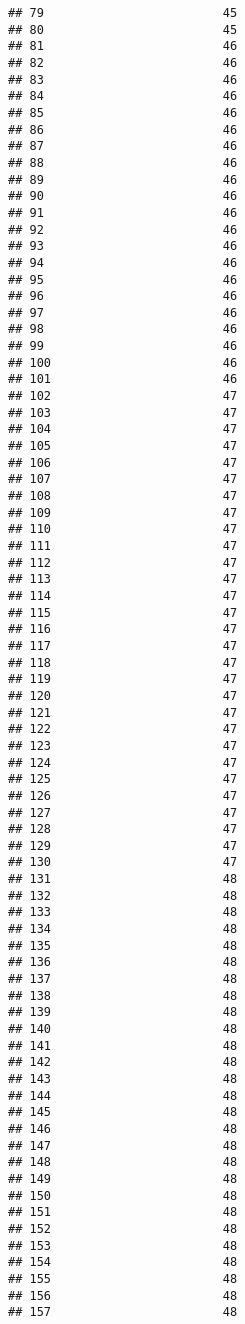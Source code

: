 \documentclass[
]{article}
\begin{document}
\begin{verbatim}
## 79                         45
## 80                         45
## 81                         46
## 82                         46
## 83                         46
## 84                         46
## 85                         46
## 86                         46
## 87                         46
## 88                         46
## 89                         46
## 90                         46
## 91                         46
## 92                         46
## 93                         46
## 94                         46
## 95                         46
## 96                         46
## 97                         46
## 98                         46
## 99                         46
## 100                        46
## 101                        46
## 102                        47
## 103                        47
## 104                        47
## 105                        47
## 106                        47
## 107                        47
## 108                        47
## 109                        47
## 110                        47
## 111                        47
## 112                        47
## 113                        47
## 114                        47
## 115                        47
## 116                        47
## 117                        47
## 118                        47
## 119                        47
## 120                        47
## 121                        47
## 122                        47
## 123                        47
## 124                        47
## 125                        47
## 126                        47
## 127                        47
## 128                        47
## 129                        47
## 130                        47
## 131                        48
## 132                        48
## 133                        48
## 134                        48
## 135                        48
## 136                        48
## 137                        48
## 138                        48
## 139                        48
## 140                        48
## 141                        48
## 142                        48
## 143                        48
## 144                        48
## 145                        48
## 146                        48
## 147                        48
## 148                        48
## 149                        48
## 150                        48
## 151                        48
## 152                        48
## 153                        48
## 154                        48
## 155                        48
## 156                        48
## 157                        48

\end{verbatim}
\end{document}
